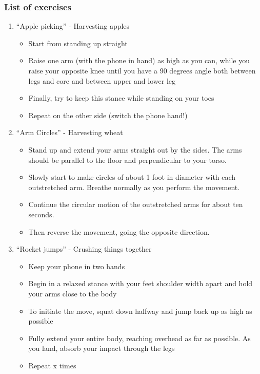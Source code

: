 \documentclass[a4paper,11pt,notitlepage]{report}
\begin{document}
\subsubsection{List of exercises}
\begin{enumerate}
\item “Apple picking” - Harvesting apples
\begin{itemize}
\item Start from standing up straight
\item Raise one arm (with the phone in hand) as high as you can, while you raise your opposite knee until you have a 90 degrees angle both between legs and core and between upper and lower leg
\item Finally, try to keep this stance while standing on your toes
\item Repeat on the other side (switch the phone hand!)
\end{itemize}
\item “Arm Circles” - Harvesting wheat
\begin{itemize}
\item Stand up and extend your arms straight out by the sides. The arms should be parallel to the floor and perpendicular to your torso.
\item Slowly start to make circles of about 1 foot in diameter with each outstretched arm. Breathe normally as you perform the movement.
\item Continue the circular motion of the outstretched arms for about ten seconds.
\item Then reverse the movement, going the opposite direction.
\end{itemize}
\item “Rocket jumps” - Crushing things together
\begin{itemize}
\item Keep your phone in two hands
\item Begin in a relaxed stance with your feet shoulder width apart and hold your arms close to the body
\item To initiate the move, squat down halfway and jump back up as high as possible
\item Fully extend your entire body, reaching overhead as far as possible. As you land, absorb your impact through the legs
\item Repeat x times
\end{itemize}
\end{enumerate}
\end{document}
